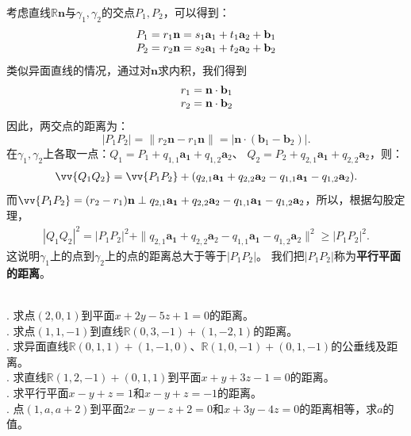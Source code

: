 \documentclass[12pt,UTF8]{ctexbook}
\begin{document}
考虑直线$\mathbb{R}\mathbf{n}$与$\gamma_1,\gamma_2$的交点$P_1,P_2$，可以得到：
$$
\begin{array}[]{c}
    P_1 = r_1\mathbf{n} = s_1\mathbf{a}_1 + t_1\mathbf{a}_2 + \mathbf{b}_1 \\
    P_2 = r_2\mathbf{n} = s_2\mathbf{a}_1 + t_2\mathbf{a}_2 + \mathbf{b}_2 
\end{array} 
$$
类似异面直线的情况，通过对$\mathbf{n}$求内积，我们得到
$$
\begin{array}[]{c}
    r_1 = \mathbf{n}\cdot\mathbf{b}_1 \\
    r_2 = \mathbf{n}\cdot\mathbf{b}_2 
\end{array}
$$
因此，两交点的距离为：
$$ |P_1P_2| = \| r_2\mathbf{n} - r_1\mathbf{n}\| = |\mathbf{n}\cdot(\mathbf{b}_1 - \mathbf{b}_2)|. $$
在$\gamma_1,\gamma_2$上各取一点：$Q_1 = P_1 + q_{1,1}\mathbf{a_1} + q_{1,2}\mathbf{a}_2$、
$Q_2 = P_2 + q_{2,1}\mathbf{a_1} + q_{2,2}\mathbf{a}_2$，则：
\begin{align*}
    \vv{Q_1Q_2} = \vv{P_1P_2}  + (q_{2,1}\mathbf{a_1} + q_{2,2}\mathbf{a}_2 - q_{1,1}\mathbf{a_1} - q_{1,2}\mathbf{a}_2).  
\end{align*}
而$\vv{P_1P_2} = (r_2 - r_1)\mathbf{n} \perp q_{2,1}\mathbf{a_1} + q_{2,2}\mathbf{a}_2 - q_{1,1}\mathbf{a_1} - q_{1,2}\mathbf{a}_2$，所以，根据勾股定理，
\begin{align*}
    |Q_1Q_2|^2 = |P_1P_2|^2 + \|q_{2,1}\mathbf{a_1} + q_{2,2}\mathbf{a}_2 - q_{1,1}\mathbf{a_1} - q_{1,2}\mathbf{a}_2\|^2 \geqslant |P_1P_2|^2.  
\end{align*}
这说明$\gamma_1$上的点到$\gamma_2$上的点的距离总大于等于$|P_1P_2|$。
我们把$|P_1P_2|$称为\textbf{平行平面的距离}。

\begin{xt}
    \mbox{} \\
    . 求点$(2,0,1)$到平面$x +2y - 5z + 1 = 0$的距离。\\
    . 求点$(1,1,-1)$到直线$\mathbb{R}(0,3,-1) + (1,-2,1)$的距离。\\
    . 求异面直线$\mathbb{R}(0,1,1)+(1,-1,0)$、$\mathbb{R}(1,0,-1)+(0,1,-1)$的公垂线及距离。\\
    . 求直线$\mathbb{R}(1,2,-1) + (0,1,1)$到平面$x + y + 3z - 1 = 0$的距离。\\
    . 求平行平面$x-y+z=1$和$x-y+z=-1$的距离。\\
    . 点$(1,a,a+2)$到平面$2x - y - z + 2 = 0$和$x + 3y - 4z = 0$的距离相等，求$a$的值。
\end{xt}
\end{document}
